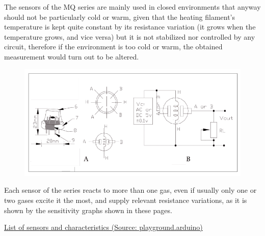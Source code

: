 \documentclass{article}\usepackage[]{graphicx}\usepackage[]{color}
\begin{document}
The sensors of the MQ series are mainly used in closed environments that anyway should not be particularly cold or warm, given that the heating filament's temperature is kept quite constant by its resistance variation (it grows when the temperature grows, and vice versa) but it is not stabilized nor controlled by any circuit, therefore if the environment is too cold or warm, the obtained measurement would turn out to be altered.

\begin{figure}
\includegraphics[width=1.0\textwidth]{MQ-X2.png}
\end{figure}

Each sensor of the series reacts to more than one gas, even if usually only one or two gases excite it the most, and supply relevant resistance variations, as it is shown by the sensitivity graphs shown in these pages.


\href{https://playground.arduino.cc/Main/MQGasSensors/#list}{List of sensors and characteristics (Source: playground.arduino)}
\end{document}
